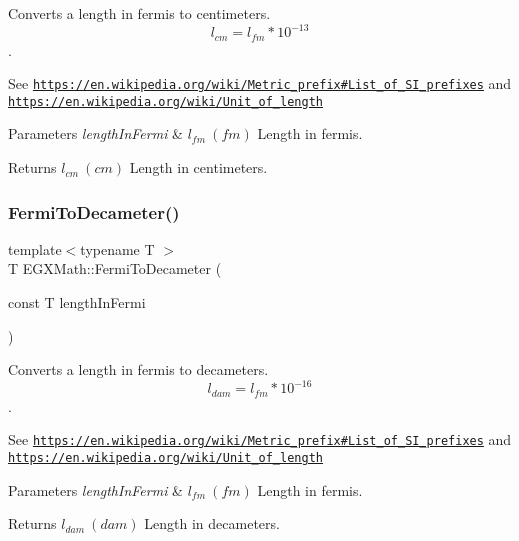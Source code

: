 Converts a length in fermis to centimeters. \[ l_{cm}=l_{fm} * 10^{-13} \]. 

See \href{https://en.wikipedia.org/wiki/Metric_prefix#List_of_SI_prefixes}{\tt https\+://en.\+wikipedia.\+org/wiki/\+Metric\+\_\+prefix\#\+List\+\_\+of\+\_\+\+S\+I\+\_\+prefixes} and \href{https://en.wikipedia.org/wiki/Unit_of_length}{\tt https\+://en.\+wikipedia.\+org/wiki/\+Unit\+\_\+of\+\_\+length} 
\begin{DoxyParams}{Parameters}
{\em length\+In\+Fermi} & $ l_{fm}\ (fm)$ Length in fermis. \\
\hline
\end{DoxyParams}
\begin{DoxyReturn}{Returns}
$ l_{cm}\ (cm)$ Length in centimeters. 
\end{DoxyReturn}
\mbox{\label{group___e_g_x_math-_conversions-_length_conversions-_non-_s_i-_fermi-_s_i_ga7119536a4a74664e533c6bdfa1deba71}} 
\subsubsection{\texorpdfstring{Fermi\+To\+Decameter()}{FermiToDecameter()}}
{\footnotesize\ttfamily template$<$typename T $>$ \\
T E\+G\+X\+Math\+::\+Fermi\+To\+Decameter (\begin{DoxyParamCaption}\item[{const T}]{length\+In\+Fermi }\end{DoxyParamCaption})}



Converts a length in fermis to decameters. \[ l_{dam}=l_{fm} * 10^{-16} \]. 

See \href{https://en.wikipedia.org/wiki/Metric_prefix#List_of_SI_prefixes}{\tt https\+://en.\+wikipedia.\+org/wiki/\+Metric\+\_\+prefix\#\+List\+\_\+of\+\_\+\+S\+I\+\_\+prefixes} and \href{https://en.wikipedia.org/wiki/Unit_of_length}{\tt https\+://en.\+wikipedia.\+org/wiki/\+Unit\+\_\+of\+\_\+length} 
\begin{DoxyParams}{Parameters}
{\em length\+In\+Fermi} & $ l_{fm}\ (fm)$ Length in fermis. \\
\hline
\end{DoxyParams}
\begin{DoxyReturn}{Returns}
$ l_{dam}\ (dam)$ Length in decameters. 
\end{DoxyReturn}
\mbox{\label{group___e_g_x_math-_conversions-_length_conversions-_non-_s_i-_fermi-_s_i_ga2cfa1fa15a1113ea5eb214a6954240a9}} 
